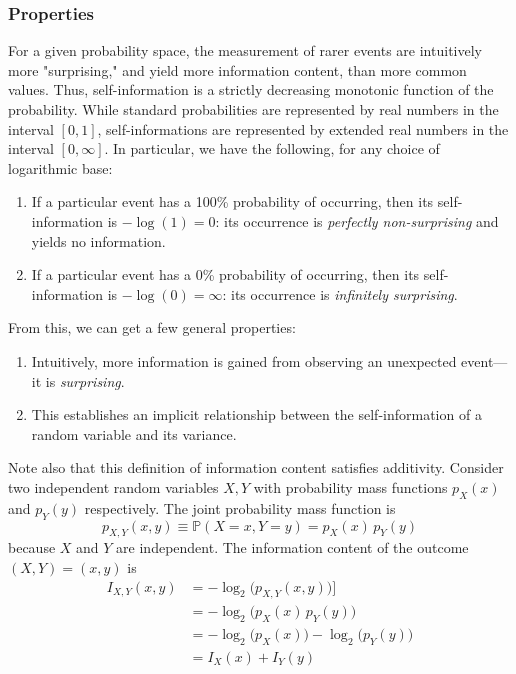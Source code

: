 \documentclass[a4paper, 12pt]{report}
\theoremstyle{remark}
\theoremstyle{definition}
\begin{document}
\subsubsection{Properties}
For a given probability space, the measurement of rarer events are intuitively more "surprising," and yield more information content, than more common values. Thus, self-information is a strictly decreasing monotonic function of the probability. While standard probabilities are represented by real numbers in the interval $[0,1]$, self-informations are represented by extended real numbers in the interval $[0,\infty]$. In particular, we have the following, for any choice of logarithmic base:
\begin{enumerate}
    \item If a particular event has a 100\% probability of occurring, then its self-information is $-\log (1) = 0$: its occurrence is \textit{perfectly non-surprising} and yields no information.
    \item If a particular event has a 0\% probability of occurring, then its self-information is $- \log (0) = \infty$: its occurrence is \textit{infinitely surprising}.
\end{enumerate}
From this, we can get a few general properties: 
\begin{enumerate}
    \item Intuitively, more information is gained from observing an unexpected event—it is \textit{surprising}.
    \item This establishes an implicit relationship between the self-information of a random variable and its variance. 
\end{enumerate}
Note also that this definition of information content satisfies additivity. Consider two independent random variables $X, Y$ with probability mass functions $p_X (x)$ and $p_Y (y)$ respectively. The joint probability mass function is 
\[p_{X, Y} (x, y) \equiv \mathbb{P} (X = x, Y = y) = p_X (x) \, p_Y (y)\]
because $X$ and $Y$ are independent. The information content of the outcome $(X, Y) = (x, y)$ is 
\begin{align*}
    I_{X, Y} (x, y) & = - \log_2 \big( p_{X, Y} (x, y) \big) ]\\
    & = -\log_2 \big(p_X (x) \, p_Y (y)\big) \\
    & = - \log_2 \big( p_X (x) \big) - \log_2 \big( p_Y (y) \big) \\
    & = I_X (x) + I_Y (y)
\end{align*}
\end{document}
